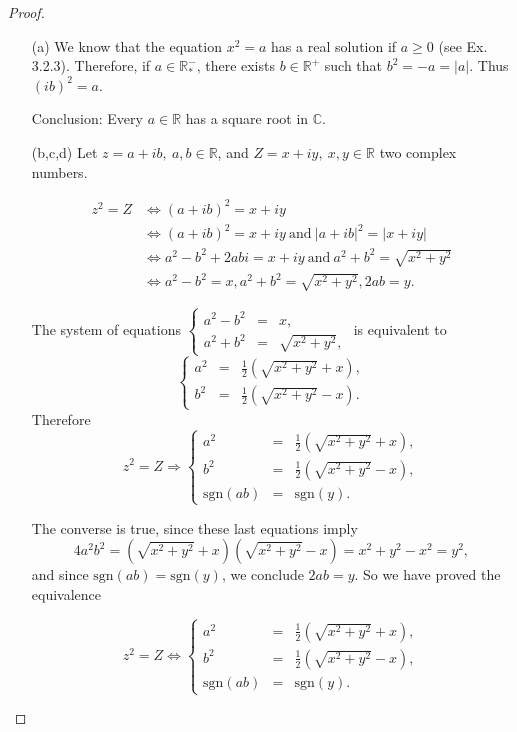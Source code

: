 \documentclass[11pt,a4paper]{article}
\begin{document}
\begin{proof}
\begin{enumerate}
\item[(a)] 
We know that the equation $x^2 = a$ has a real solution if $a\geq 0$ (see Ex. 3.2.3).
Therefore, if $a \in \mathbb{R}^-_*$, there exists $b\in \mathbb{R}^+$ such that $b^2 = -a = \vert a \vert$.
Thus $(ib)^2 = a$.

Conclusion: Every $a \in \mathbb{R}$ has a square root in $\mathbb{C}$.

\item[(b,c,d)] Let $z = a+ib,\ a,b \in \mathbb{R}$, and $Z = x+iy,\ x,y \in \mathbb{R}$ two complex numbers.

\begin{align*}
z^2 = Z &\iff (a+ ib)^2 = x+iy\\
&\iff (a+ ib)^2 = x+iy \ \mathrm{and} \ \vert a+ ib\vert ^2 = \vert x+iy\vert \\
&\iff a^2 - b^2 +2abi = x+iy\ \mathrm{and} \ a^2+b^2 = \sqrt{x^2+y^2}\\
&\iff a^2 - b^2 = x, a^2 + b^2 =\sqrt{x^2+y^2}, 2ab = y.
\end{align*}

The system of equations
$
\left\{
\begin{array}{ccc}
a^2 - b^2 &=& x,   \\
a^2 + b^2 &=&\sqrt{x^2+y^2}, 
\end{array}
\right.
$
is equivalent to
$$
\left\{
\begin{array}{ccc}
a^2  &=&\frac{1}{2}\left(  \sqrt{x^2+y^2}  + x\right),  \\
 b^2 &=&\frac{1}{2}\left( \sqrt{x^2+y^2} -x\right).
\end{array}
\right.
$$
Therefore $$z^2 = Z \Rightarrow 
\left\{
\begin{array}{ccc}
a^2  &=&\frac{1}{2}\left(  \sqrt{x^2+y^2}  + x\right),  \\
 b^2 &=&\frac{1}{2}\left( \sqrt{x^2+y^2} -x\right), \\
 \mathrm{sgn}(ab) &= & \mathrm{sgn}(y).
\end{array}
\right.
$$

The converse is true, since these last equations imply
$$4a^2 b^2 = \left(  \sqrt{x^2+y^2}  + x\right) \left( \sqrt{x^2+y^2} -x\right) = x^2+y^2-x^2 = y^2,$$
and since $\mathrm{sgn}(ab) =  \mathrm{sgn}(y)$, we conclude $2ab=y$. So we have proved the equivalence

$$z^2 = Z \iff
\left\{
\begin{array}{ccc}
a^2  &=&\frac{1}{2}\left(  \sqrt{x^2+y^2}  + x\right),  \\
 b^2 &=&\frac{1}{2}\left( \sqrt{x^2+y^2} -x\right), \\
 \mathrm{sgn}(ab) &= & \mathrm{sgn}(y).
\end{array}
\right. 
$$


\end{enumerate}
\end{proof}
\end{document}
